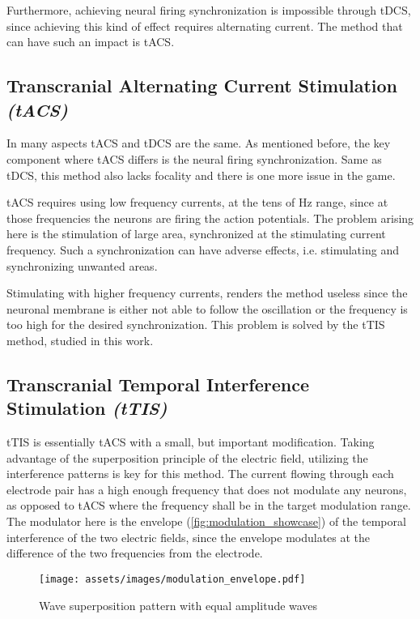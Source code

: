 Furthermore, achieving neural firing synchronization is impossible through \gls{tDCS}, since achieving this kind of effect requires alternating current. The method that can have such an impact is \gls{tACS}.

\subsection{Transcranial Alternating Current Stimulation \textit{(tACS)}}

In many aspects \gls{tACS} and \gls{tDCS} are the same. As mentioned before, the key component where \gls{tACS} differs is the neural firing synchronization. Same as \gls{tDCS}, this method also lacks focality and there is one more issue in the game.

\gls{tACS} requires using low frequency currents, at the tens of Hz range, since at those frequencies the neurons are firing the action potentials. The problem arising here is the stimulation of large area, synchronized at the stimulating current frequency. Such a synchronization can have adverse effects, i.e. stimulating and synchronizing unwanted areas.

Stimulating with higher frequency currents, renders the method useless since the neuronal membrane is either not able to follow the oscillation or the frequency is too high for the desired synchronization. This problem is solved by the \gls{tTIS} method, studied in this work.

\subsection{Transcranial Temporal Interference Stimulation \textit{(tTIS)}}

\gls{tTIS} is essentially \gls{tACS} with a small, but important modification. Taking advantage of the superposition principle of the electric field, utilizing the interference patterns is key for this method. The current flowing through each electrode pair has a high enough frequency that does not modulate any neurons, as opposed to \gls{tACS} where the frequency shall be in the target modulation range. The modulator here is the envelope (\autoref{fig:modulation_showcase}) of the temporal interference of the two electric fields, since the envelope modulates at the difference of the two frequencies from the electrode.

\begin{figure}[H]
    \centering
    \texttt{[image: assets/images/modulation\_envelope.pdf]}
    \caption{Wave superposition pattern with equal amplitude waves}
    \label{fig:modulation_showcase}
\end{figure}

